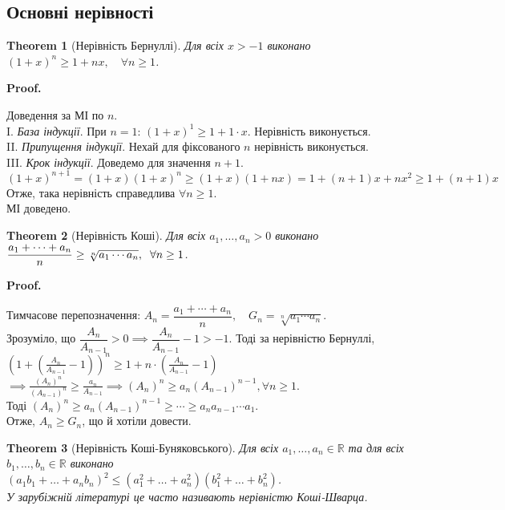 \documentclass[a4paper, 14pt]{article}
\makeatletter
\def\qed{$\blacksquare$}
\theoremstyle{theoremdd}
\newtheorem{theorem}{Theorem}[subsection]
\theoremstyle{theoremdd}
\theoremstyle{theoremdd}
\theoremstyle{theoremdd}
\theoremstyle{theoremdd}
\theoremstyle{theoremdd}
\theoremstyle{theoremdd}
\theoremstyle{theoremdd}
\renewenvironment{proof}[1][Proof.\\]{\par
\pushQED{\hfill \qed}%
\normalfont \topsep6\p@\@plus6\p@\relax
\trivlist
\item\relax
{\bfseries
#1\@addpunct{.}}\hspace\labelsep\ignorespaces
}{%
\popQED\endtrivlist\@endpefalse
}
\makeatother
\begin{document}
	\subsection*{Основні нерівності}
	\begin{theorem}[Нерівність Бернуллі]
	Для всіх $x > -1$ виконано $(1+x)^n \geq 1+nx, \quad \forall n \geq 1$.
	\end{theorem}
	
	\begin{proof}
	Доведення за МІ по $n$.\\
	I. \textit{База індукції}. При $n=1$: $(1+x)^1 \geq 1+1\cdot x$. Нерівність виконується.\\
	II. \textit{Припущення індукції}. Нехай для фіксованого $n$ нерівність виконується.\\
	III. \textit{Крок індукції}. Доведемо для значення $n+1$.\\
	$(1+x)^{n+1}=(1+x)(1+x)^n \geq (1+x)(1+nx)=1+(n+1)x+nx^2 \geq 1+(n+1)x$\\
	Отже, така нерівність справедлива $\forall n \geq 1$. \\
	МІ доведено.
	\end{proof}
	
	\begin{theorem}[Нерівність Коші]
	Для всіх $a_1,\dots,a_n > 0$ виконано
	$\dfrac{a_1+\cdots+a_n}{n} \geq \sqrt[n]{a_1 \cdots a_n}, \hspace{0.2cm} \forall n \geq 1$.
	\end{theorem}
	
	\begin{proof}
	Тимчасове перепозначення: $A_n = \dfrac{a_1+\cdots+a_n}{n}, \quad G_n = \sqrt[n]{a_1 \cdots a_n}$.\\
	Зрозуміло, що $\dfrac{A_n}{A_{n-1}} > 0 \implies \dfrac{A_n}{A_{n-1}}-1>-1$. Тоді за нерівністю Бернуллі,\\
	$\displaystyle \left(1+ \left(\frac{A_n}{A_{n-1}} -1 \right) \right)^n \geq 1 + n \cdot \left(\frac{A_n}{A_{n-1}} -1 \right)$
	$\implies \displaystyle \frac{(A_n)^n}{(A_{n-1})^n} \geq \frac{a_n}{A_{n-1}} \implies \displaystyle (A_n)^n \geq a_n (A_{n-1})^{n-1}, \forall n \geq 1$. \\ Тоді $(A_n)^n \geq a_n (A_{n-1})^{n-1} \geq \cdots \geq a_n a_{n-1} \cdots a_1$. \\ Отже, $A_n \geq G_n$, що й хотіли довести.
	\end{proof}
	
	\begin{theorem}[Нерівність Коші-Буняковського]
	Для всіх $a_1,\dots,a_n \in \mathbb{R}$ та для всіх $b_1,\dots,b_n \in \mathbb{R}$ виконано\\
	$(a_1 b_1 + \dots + a_n b_n)^2 \leq (a_1^2 + \dots + a_n^2) (b_1^2 + \dots + b_n^2)$.\\
	\textit{У зарубіжній літературі це часто називають нерівністю Коші-Шварца.}
	\end{theorem}
	
\end{document}
